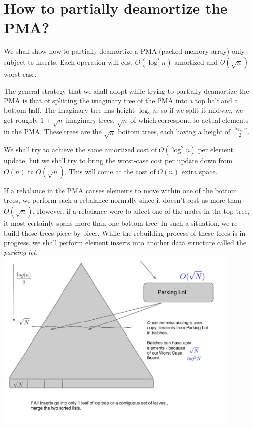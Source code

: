 \documentclass[10pt]{article}
\begin{document}
\section{How to partially deamortize the PMA?}

We shall show how to partially deamortize a PMA (packed memory array)
only subject to inserts. Each operation will cost $O(\log^2{n})$
amortized and $O(\sqrt{n})$ worst case.

The general strategy that we shall adopt while trying to partially
deamortize the PMA is that of splitting the imaginary tree of the PMA
into a top half and a bottom half. The imaginary tree has height
$\log_2{n}$, so if we split it midway, we get roughly $1 +
\sqrt{n}$ imaginary trees, $\sqrt{n}$ of which correspond to actual
elements in the PMA. These trees are the $\sqrt{n}$ bottom trees, each
having a height of $\frac{\log_2{n}}{2}$.

We shall try to achieve the same amortized cost of $O(\log^2{n})$ per
element update, but we shall try to bring the worst-case cost per
update down from $O(n)$ to $O(\sqrt{n})$. This will come at the cost
of $O(n)$ extra space.

If a rebalance in the PMA causes elements to move within one of the
bottom trees, we perform such a rebalance normally since it doesn't
cost us more than $O(\sqrt{n})$. However, if a rebalance were to
affect one of the nodes in the top tree, it most certainly spans more
than one bottom tree. In such a situation, we re-build those trees
piece-by-piece. While the rebuilding process of these trees is in
progress, we shall perform element inserts into another data structure
called the \textit{parking lot}. \\

\includegraphics[width=120mm]{img1.jpg} \\
\end{document}
